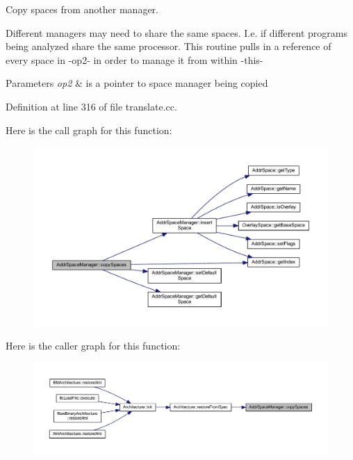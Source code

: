 Copy spaces from another manager. 

Different managers may need to share the same spaces. I.\+e. if different programs being analyzed share the same processor. This routine pulls in a reference of every space in -\/op2-\/ in order to manage it from within -\/this-\/ 
\begin{DoxyParams}{Parameters}
{\em op2} & is a pointer to space manager being copied \\
\hline
\end{DoxyParams}


Definition at line 316 of file translate.\+cc.

Here is the call graph for this function\+:
\nopagebreak
\begin{figure}[H]
\begin{center}
\leavevmode
\includegraphics[width=350pt]{class_addr_space_manager_a45068bcc8331bebc780f00e51bd85250_cgraph}
\end{center}
\end{figure}
Here is the caller graph for this function\+:
\nopagebreak
\begin{figure}[H]
\begin{center}
\leavevmode
\includegraphics[width=350pt]{class_addr_space_manager_a45068bcc8331bebc780f00e51bd85250_icgraph}
\end{center}
\end{figure}
\mbox{\label{class_addr_space_manager_a5dc6c782b2b4c4c300aaa491e40719b8}} 
